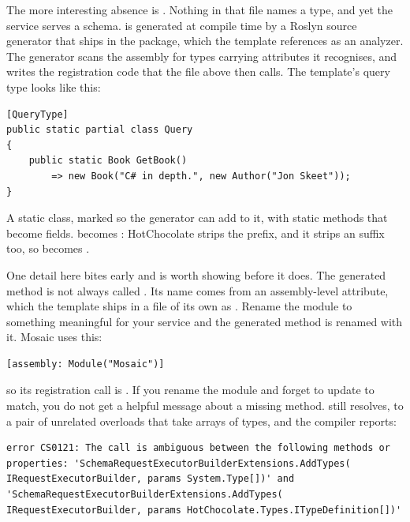 %
The more interesting absence is . Nothing in that file names a type,
and yet the service serves a schema.  is generated at compile
time by a Roslyn source generator that ships in the
 package, which the template references as an
analyzer. The generator scans the assembly for types carrying attributes it
recognises, and writes the registration code that the file above then calls.
The template's query type looks like this:

\begin{verbatim}
[QueryType]
public static partial class Query
{
    public static Book GetBook()
        => new Book("C# in depth.", new Author("Jon Skeet"));
}
\end{verbatim}

A static class, marked  so the generator can add to it, with
static methods that become fields.  becomes :
HotChocolate strips the  prefix, and it strips an  suffix
too, so  becomes .

%
One detail here bites early and is worth showing before it does. The generated
method is not always called . Its name comes from an
assembly-level attribute, which the template ships in a file of its own as
. Rename the module to something meaningful for your
service and the generated method is renamed with it. Mosaic uses this:

\begin{verbatim}
[assembly: Module("Mosaic")]
\end{verbatim}

so its registration call is . If you rename the module and
forget to update  to match, you do not get a helpful message
about a missing method.  still resolves, to a pair of unrelated
 overloads that take arrays of types, and the compiler reports:

\begin{verbatim}
error CS0121: The call is ambiguous between the following methods or
properties: 'SchemaRequestExecutorBuilderExtensions.AddTypes(
IRequestExecutorBuilder, params System.Type[])' and
'SchemaRequestExecutorBuilderExtensions.AddTypes(
IRequestExecutorBuilder, params HotChocolate.Types.ITypeDefinition[])'
\end{verbatim}

